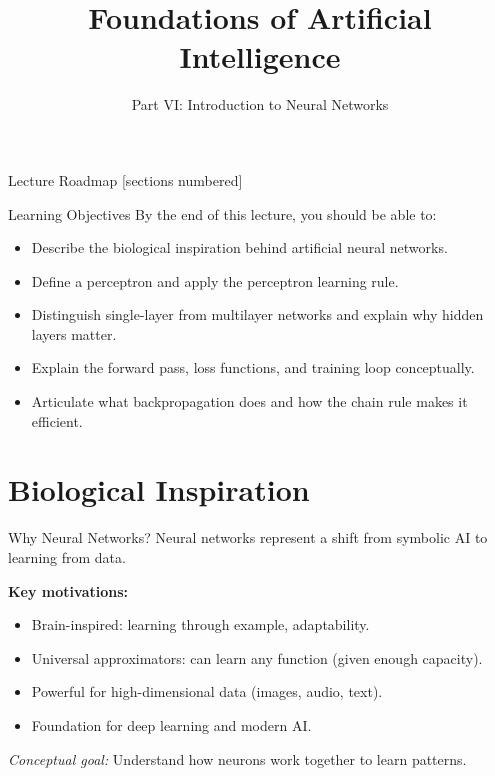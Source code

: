 \documentclass[10pt]{beamer}
\title{Foundations of Artificial Intelligence}
\subtitle{Part VI: Introduction to Neural Networks}
\institute{Department of Computer Science}
\date{}
\begin{document}
\maketitle

\begin{frame}{Lecture Roadmap}
    [sections numbered]
    \tableofcontents[hideallsubsections]
\end{frame}

\begin{frame}{Learning Objectives}
    By the end of this lecture, you should be able to:
    \begin{itemize}
        \item Describe the biological inspiration behind artificial neural networks.
        \item Define a perceptron and apply the perceptron learning rule.
        \item Distinguish single-layer from multilayer networks and explain why hidden layers matter.
        \item Explain the forward pass, loss functions, and training loop conceptually.
        \item Articulate what backpropagation does and how the chain rule makes it efficient.
    \end{itemize}
\end{frame}

\section{Biological Inspiration}

\begin{frame}{Why Neural Networks?}
    Neural networks represent a shift from symbolic AI to learning from data.

    \vspace{0.2cm}
    \textbf{Key motivations:}
    \begin{itemize}
        \item Brain-inspired: learning through example, adaptability.
        \item Universal approximators: can learn any function (given enough capacity).
        \item Powerful for high-dimensional data (images, audio, text).
        \item Foundation for deep learning and modern AI.
    \end{itemize}

    \vspace{0.2cm}
    \textit{Conceptual goal:} Understand how neurons work together to learn patterns.
\end{frame}
\end{document}
